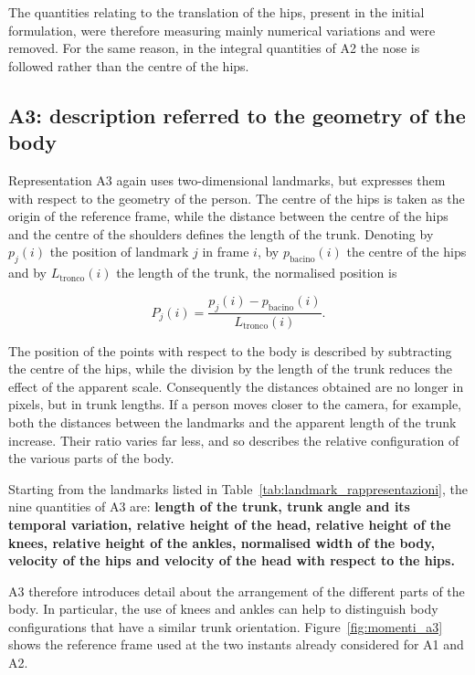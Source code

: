 The quantities relating to the translation of the hips, present in the initial formulation, were therefore measuring mainly numerical variations and were removed. For the same reason, in the integral quantities of A2 the nose is followed rather than the centre of the hips.

\subsection{A3: description referred to the geometry of the body}

Representation A3 again uses two-dimensional landmarks, but expresses them with respect to the geometry of the person. The centre of the hips is taken as the origin of the reference frame, while the distance between the centre of the hips and the centre of the shoulders defines the length of the trunk. Denoting by $p_j(i)$ the position of landmark $j$ in frame $i$, by $p_{\text{bacino}}(i)$ the centre of the hips and by
$L_{\text{tronco}}(i)$ the length of the trunk, the normalised position is

\begin{equation}
P_j(i) =
\frac{p_j(i)-p_{\text{bacino}}(i)}
{L_{\text{tronco}}(i)} .
\label{eq:normalizzazione}
\end{equation}

The position of the points with respect to the body is described by subtracting the centre of the hips, while the division by the length of the trunk reduces the effect of the apparent scale. Consequently the distances obtained are no longer in pixels, but in trunk lengths. If a person moves closer to the camera, for example, both the distances between the landmarks and the apparent length of the trunk increase. Their ratio varies far less, and so describes the relative configuration of the various parts of the body.

Starting from the landmarks listed in Table~\ref{tab:landmark_rappresentazioni}, the nine quantities of A3 are: \textbf{length of the trunk, trunk angle and its temporal variation, relative height of the head, relative height of the knees, relative height of the ankles, normalised width of the body, velocity of the hips and velocity of the head with respect to the hips.}

A3 therefore introduces detail about the arrangement of the different parts of the body. In particular, the use of knees and ankles can help to distinguish body configurations that have a similar trunk orientation. Figure~\ref{fig:momenti_a3} shows the reference frame used at the two instants already considered for A1 and A2.

